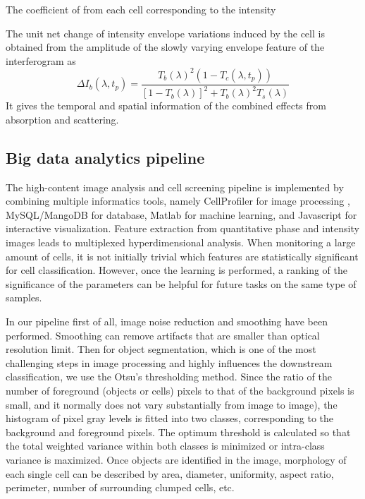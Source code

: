 \documentclass[aps,pra,reprint,longbibliography,superscriptaddress]{revtex4-1}
\begin{document}
The coefficient of  from each cell corresponding to the intensity  

The unit net change of intensity envelope variations induced by the cell is obtained from the amplitude of the slowly varying envelope feature of the interferogram as
\begin{equation}
\Delta I_b(\lambda, t_p) = \frac{T_b(\lambda)^2 (1 - T_c(\lambda, t_p))}{[1-T_b(\lambda)]^2 + T_b(\lambda)^2 T_s(\lambda)}
\end{equation}
It gives the temporal and spatial information of the combined effects from absorption and scattering. 


\subsection{Big data analytics pipeline}

The high-content image analysis and cell screening pipeline is implemented by combining multiple informatics tools, namely CellProfiler for image processing \cite{carpenter2006cellprofiler,kamentsky2011improved}, MySQL/MangoDB for database, Matlab for machine learning, and Javascript for interactive visualization. 
Feature extraction from quantitative phase and intensity images leads to multiplexed hyperdimensional analysis. When monitoring a large amount of cells, it is not initially trivial which features are statistically significant for cell classification. However, once the learning is performed, a ranking of the significance of the parameters can be helpful for future tasks on the same type of samples. 

In our pipeline first of all, image noise reduction and smoothing have been performed. Smoothing can remove artifacts that are smaller than optical resolution limit. Then for object segmentation, which is one of the most challenging steps in image processing and highly influences the downstream classification, we use the Otsu's thresholding method. Since the ratio of the number of foreground (objects or cells) pixels to that of the background pixels is small, and it normally does not vary substantially from image to image), the histogram of pixel gray levels is fitted into two classes,  corresponding to the background and foreground pixels. The optimum threshold is calculated so that the total weighted variance within both classes is minimized or intra-class variance is maximized. Once objects are identified in the image, morphology of each single cell can be described by area, diameter, uniformity, aspect ratio, perimeter, number of surrounding clumped cells, etc.
\end{document}
